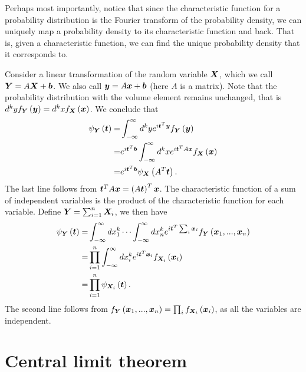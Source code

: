 Perhaps most importantly, notice that since the characteristic function
for a probability distribution is the Fourier transform of the probability density,
we can uniquely map a probability density to its characteristic function and back.
That is, given a characteristic function, we can find the unique probability
density that it corresponds to.

Consider a linear transformation of the random variable ${\bm X}$,
which we call ${\bm Y} = A{\bm X} + {\bm b}$. We also call ${\bm y} = A{\bm x} + {\bm b}$ (here $A$ is a matrix).
Note that the probability distribution with the volume element remains unchanged, that is 
$d^ky f_{{\bm Y}}\left({\bm y}\right)
    =
    d^kx f_{{\bm X}}\left({\bm x}\right)
    $.
We conclude that
\begin{align}
    \psi_{{\bm Y}}\left({\bm t}\right)
    =&
    \int_{-\infty}^{\infty} d^ky e^{i{\bm t}^T{\bm y}} f_{{\bm Y}}\left({\bm y}\right)
    \nonumber\\
    =&
    e^{i{\bm t}^T{\bm b}}\int_{-\infty}^{\infty} d^kx e^{i{\bm t}^TA{\bm x}} f_{{\bm X}}\left({\bm x}\right)
    \nonumber\\
    =&
    e^{i{\bm t}^T{\bm b}}\psi_{{\bm X}}\left(A^T{\bm t}\right)
    .
\end{align}
The last line follows from ${\bm t}^TA{\bm x} = \left(A{\bm t}\right)^T{\bm x}$.
The characteristic function of a sum of independent variables is the product of the characteristic function for each variable.
Define ${\bm Y} = \sum_{i=1}^n {\bm X}_i$, we then have
\begin{align}
    \psi_{{\bm Y}}\left({\bm t}\right)
    =&
    \int_{-\infty}^{\infty} dx^k_1\cdots \int_{-\infty}^{\infty} dx^k_n 
        e^{i{\bm t}^T\sum_i{\bm x}_i} f_{{\bm Y}}\left({\bm x}_1,...,{\bm x}_n\right)  
    \nonumber\\
    =&
    \prod_{i=1}^n \int_{-\infty}^{\infty} dx^k_i e^{i{\bm t}^T{\bm x}_i} f_{{\bm X}_i}\left({\bm x}_i\right)
    \nonumber\\
    =&
    \prod_{i=1}^n \psi_{{\bm X}_i}\left({\bm t}\right) 
    .
\end{align}
The second line follows from 
$f_{{\bm Y}}\left({\bm x}_1,...,{\bm x}_n\right)=\prod_i f_{{\bm X}_i}\left({\bm x}_i\right)$,
as all the variables are independent.


\section{Central limit theorem}

